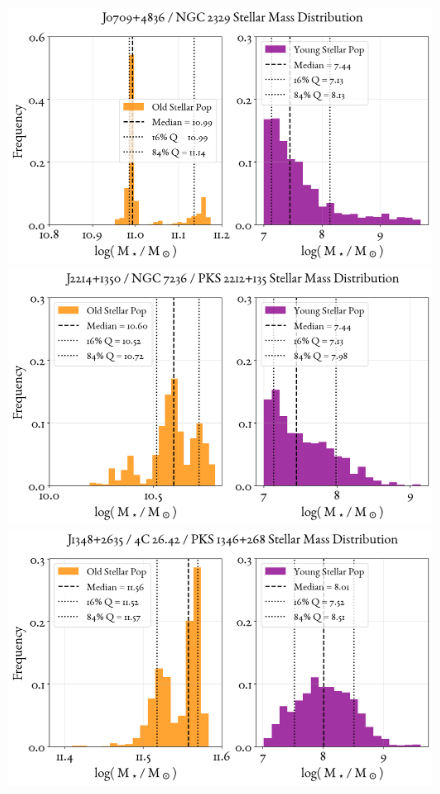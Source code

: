 \begin{figure}
    \centering
    \includegraphics[width=0.8\linewidth]{figures/ResultMasses/95_MassDistri_5263.png}\\
    \includegraphics[width=0.8\linewidth]{figures/ResultMasses/96_MassDistri_5275.png}\\
    \includegraphics[width=0.8\linewidth]{figures/ResultMasses/103_MassDistri_5300.png}    
\end{figure}
